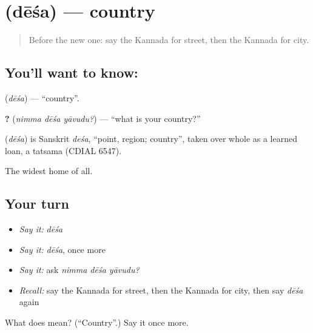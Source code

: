 \section[\texorpdfstring{\kn{ದೇಶ} (dēśa)}{ದೇಶ (dēśa)}]{ (dēśa) — country}

\label{lesson:KA-C103-country}



\begin{quote}
Before the new one: say the Kannada for street, then the Kannada for city.
\end{quote}

\subsection*{You'll want to know: }
\textbf{} (\emph{dēśa}) — \textquotedblleft{}country\textquotedblright{}.

\textbf{  ?} (\emph{nimma dēśa yāvudu?}) — \textquotedblleft{}what is your country?\textquotedblright{}

\begin{cousinweb}
\textbf{} (\emph{dēśa}) is Sanskrit \emph{deśa}, \textquotedblleft{}point, region; country\textquotedblright{}, taken over whole as a learned loan, a tatsama (CDIAL 6547).
\end{cousinweb}

\begin{grammarlens}[title={What you've built}]
The widest home of all.
\end{grammarlens}

\subsection*{Your turn}
\begin{itemize}
\raggedright
  \item \emph{Say it:} \emph{dēśa}
  \item \emph{Say it:} \emph{dēśa}, once more
  \item \emph{Say it:} ask \emph{nimma dēśa yāvudu?}
  \item \emph{Recall:} say the Kannada for street, then the Kannada for city, then say \emph{dēśa} again
\end{itemize}

\begin{tcolorbox}[breakable,colback=teal!4,colframe=teal!35!black,title={Before you move on}]
What does  mean? (\textquotedblleft{}Country\textquotedblright{}.) Say it once more.
\end{tcolorbox}
